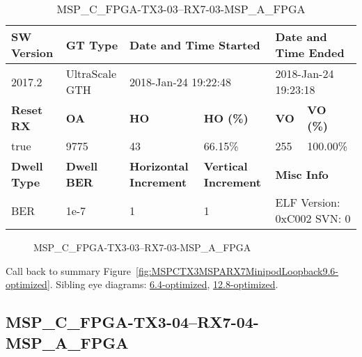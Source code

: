 \begin{table}[h]
\centering
\caption{MSP\_C\_FPGA-TX3-03--RX7-03-MSP\_A\_FPGA}
\label{tab:MSPCFPGATX303RX703MSPAFPGA9.6-optimized}
\begin{tabular}{@{}|l|l|l|l|l|l|@{}}
\toprule
\textbf{SW Version}                & \textbf{GT Type}   & \multicolumn{2}{l|}{\textbf{Date and Time Started}}            & \multicolumn{2}{l|}{\textbf{Date and Time Ended}}        \\ \midrule
2017.2                       & UltraScale GTH          & \multicolumn{2}{l|}{2018-Jan-24 19:22:48}                   & \multicolumn{2}{l|}{2018-Jan-24 19:23:18}               \\ \midrule
\textbf{Reset RX}                  & \textbf{OA} & \textbf{HO}   & \textbf{HO (\%)} & \textbf{VO} & \textbf{VO (\%)} \\ \midrule
true & 9775        & 43          & 66.15\%        & 255        & 100.00\%       \\ \midrule
\textbf{Dwell Type}                & \textbf{Dwell BER} & \textbf{Horizontal Increment} & \textbf{Vertical Increment}    & \multicolumn{2}{l|}{\textbf{Misc Info}}                  \\ \midrule
BER                            & 1e-7        & 1        & 1           & \multicolumn{2}{l|}{ELF Version: 0xC002 SVN: 0}                         \\ \bottomrule
\end{tabular}
\end{table}

\begin{figure}[h]
\caption{MSP\_C\_FPGA-TX3-03--RX7-03-MSP\_A\_FPGA} \label{fig:MSPCFPGATX303RX703MSPAFPGA9.6-optimized}
\end{figure}

Call back to summary Figure~\ref{fig:MSPCTX3MSPARX7MinipodLoopback9.6-optimized}.
Sibling eye diagrams: \hyperref[sec:MSPCFPGATX303RX703MSPAFPGA6.4-optimized]{6.4-optimized}, \hyperref[sec:MSPCFPGATX303RX703MSPAFPGA12.8-optimized]{12.8-optimized}.

\clearpage
\newpage


\subsection{MSP\_C\_FPGA-TX3-04--RX7-04-MSP\_A\_FPGA}\label{sec:MSPCFPGATX304RX704MSPAFPGA9.6-optimized}

